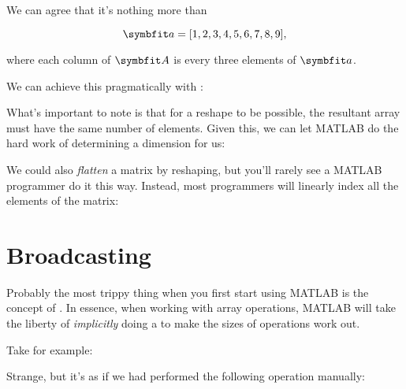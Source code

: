 \documentclass{article}
\begin{document}
We can agree that it's nothing more than

\begin{equation}
	\mat{a}
	=
	[1, 2, 3, 4, 5, 6, 7, 8, 9],
\end{equation}

where each column of \(\mat{A}\) is every three elements of \(\mat{a}\).

\begin{minipage}{\textwidth}
	We can achieve this pragmatically with :

	\vspace{1em}

\end{minipage}

What's important to note is that for a reshape to be possible, the
resultant array must have the same number of elements.  Given this, we
can let MATLAB do the hard work of determining a dimension for us:


We could also \emph{flatten} a matrix by reshaping, but you'll rarely
see a MATLAB programmer do it this way.  Instead, most programmers will
linearly index all the elements of the matrix:


\section{Broadcasting}

Probably the most trippy thing when you first start using MATLAB is the
concept of .  In essence, when working with array
operations, MATLAB will take the liberty of \emph{implicitly} doing a
 to make the sizes of operations work out.

\begin{minipage}{\textwidth}
	Take for example:

	\vspace{1em}

\end{minipage}

Strange, but it's as if we had performed the following operation
manually:

\inputminted{matlab}{02-vectorization.d/broadcast-implicit.m}
\end{document}
